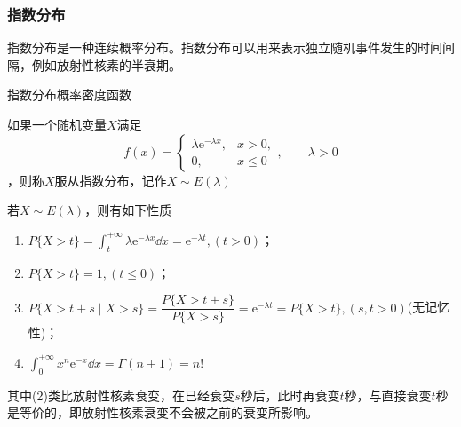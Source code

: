 \subsubsection{指数分布}
指数分布是一种连续概率分布。指数分布可以用来表示独立随机事件发生的时间间隔，例如放射性核素的半衰期。
\begin{marginfigure}
    \centering
    \caption{指数分布概率密度函数}
\end{marginfigure}
\begin{definition}
    如果一个随机变量$X$满足
    \[
        f(x) =
        \begin{cases}
            \lambda \mathrm{e}^{-\lambda x}, & x>0,    \\
            0,                               & x\leq 0
        \end{cases}
        ,\qquad \lambda > 0
    \]，则称$X$服从指数分布，记作$X\sim E(\lambda)$
\end{definition}
若$X\sim E(\lambda)$，则有如下性质
\begin{enumerate}[(1)]
    \item $\displaystyle P\{ X > t \} = \int_t^{+\infty} \lambda \mathrm{e}^{-\lambda x}\dd{x} = \mathrm{e}^{-\lambda t}, (t>0)$；
    \item $\displaystyle P\{ X > t \} = 1, (t\leq 0)$；
    \item $P\{ X > t+s \mid X>s \} = \dfrac{P\{ X>t+s \}}{P\{X > s\}} = \mathrm{e}^{-\lambda t} = P\{ X>t \}, (s,t>0)$(无记忆性)；
    \item $\displaystyle \int_0^{+\infty} x^n \mathrm{e}^{-x} \dd{x} = \Gamma(n+1) = n! $
\end{enumerate}

其中(2)类比放射性核素衰变，在已经衰变$s$秒后，此时再衰变$t$秒，与直接衰变$t$秒是等价的，即放射性核素衰变不会被之前的衰变所影响。

